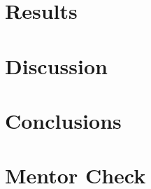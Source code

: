 \documentclass{article}
\begin{document}
\section{Results}

\section{Discussion}

\section{Conclusions}




\section{Mentor Check}
\end{document}
